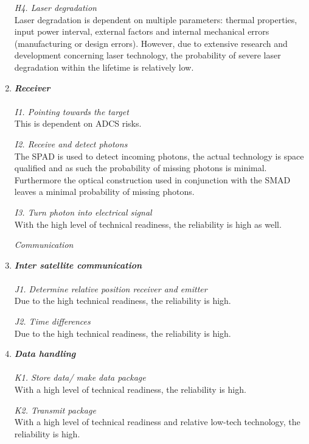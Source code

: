 \documentclass[11pt]{report}
\begin{document}
\begin{enumerate}[A]
\textit{H4. Laser degradation}\\
Laser degradation is dependent on multiple parameters: thermal properties, input power interval, external factors and internal mechanical errors (manufacturing or design errors). However, due to extensive research and development concerning laser technology, the probability of severe laser degradation within the lifetime is relatively low. 

	\item\textbf{\textit{Receiver}} \\\\
\textit{I1. Pointing towards the target} \\
This is dependent on ADCS risks.

\textit{I2. Receive and detect photons}\\ 
The \ac{SPAD} is used to detect incoming photons, the actual technology is space qualified and as such the probability of missing photons is minimal. Furthermore the optical construction used in conjunction with the \acs{SMAD} leaves a minimal probability of missing photons. 

\textit{I3. Turn photon into electrical signal}\\ 
With the high level of technical readiness, the reliability is high as well.

\begin{description}
\item[\textit{Communication}]
\end{description}
	\item\textbf{\textit{Inter satellite communication}} \\\\
\textit{J1. Determine relative position receiver and emitter}\\ 
Due to the high technical readiness, the reliability is high.

\textit{J2. Time differences}\\ 
Due to the high technical readiness, the reliability is high.

	\item\textbf{\textit{Data handling}} \\\\
\textit{K1. Store data/ make data package}\\ 
With a high level of technical readiness, the reliability is high.

\textit{K2. Transmit package}\\ 
With a high level of technical readiness and relative low-tech technology, the reliability is high.


\end{enumerate}
\end{document}
